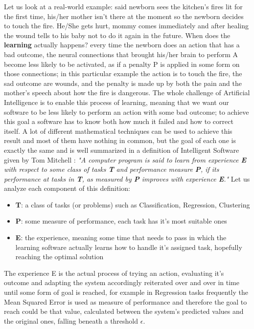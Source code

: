 \documentclass[11pt,a4paper,titlepage]{book}
\begin{document}
Let us look at a real-world example: said newborn sees the kitchen's fires lit for the first time, his/her mother isn't there at the moment so the newborn decides to touch the fire. He/She gets hurt, mommy comes immediately and after healing the wound tells to his baby not to do it again in the future.
When does the \textbf{learning} actually happens? every time the newborn does an action that has a bad outcome, the neural connections that brought his/her brain to perform A become less likely to be activated, as if a penalty P is applied in some form on those connections; in this particular example the action is to touch the fire, the sad outcome are wounds, and the penalty is made up by both the pain and the mother's speech about how the fire is dangerous.
\newline
\newline
The whole challenge of Artificial Intelligence is to enable this process of learning, meaning that we want our software to be less likely to perform an action with some bad outcome; to achieve this goal a software has to know both how much it failed and how to correct itself. 
A lot of different mathematical techniques can be used to achieve this result and most of them have nothing in common, but the goal of each one is exactly the same and is well summarized in a definition of Intelligent Software given by Tom Mitchell \cite{mitchell}:
\newline
\newline
\textit{"A computer program is said to learn from experience \textbf{E} with respect to some class of tasks \textbf{T} and performance measure \textbf{P}, if its performance at tasks in \textbf{T}, as measured by \textbf{P} improves with experience \textbf{E}."}
\newline
\newline
Let us analyze each component of this definition:
\begin{itemize}
    \item \textbf{T}: a class of tasks (or problems) such as Classification, Regression, Clustering
    \item \textbf{P}: some measure of performance, each task has it's most suitable ones 
    \item \textbf{E}: the experience, meaning some time that needs to pass in which the learning software actually learns how to handle it's assigned task, hopefully reaching the optimal solution
\end{itemize}
The experience E is the actual process of trying an action, evaluating it's outcome and adapting the system accordingly reiterated over and over in time until some form of goal is reached, for example in Regression tasks frequently the Mean Squared Error is used as measure of performance and therefore the goal to reach could be that value, calculated between the system's predicted values and the original ones, falling beneath a threshold $\epsilon$.
\end{document}
